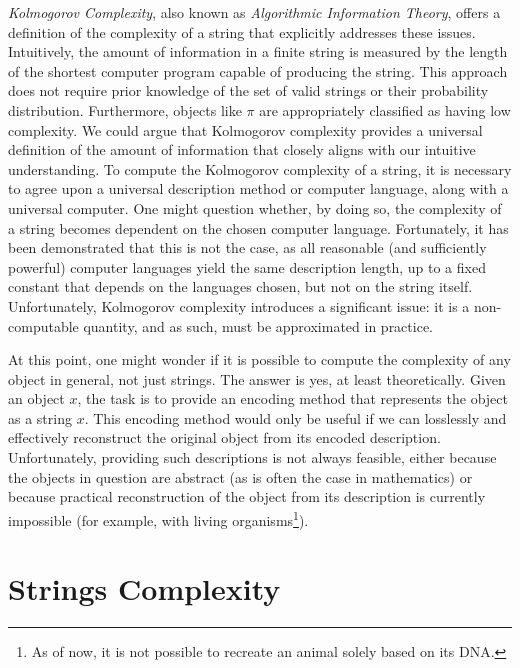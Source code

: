 \emph{Kolmogorov Complexity}, also known as \emph{Algorithmic Information Theory}, offers a definition of the complexity of a string that explicitly addresses these issues. Intuitively, the amount of information in a finite string is measured by the length of the shortest computer program capable of producing the string. This approach does not require prior knowledge of the set of valid strings or their probability distribution. Furthermore, objects like $\pi$ are appropriately classified as having low complexity. We could argue that Kolmogorov complexity provides a universal definition of the amount of information that closely aligns with our intuitive understanding. To compute the Kolmogorov complexity of a string, it is necessary to agree upon a universal description method or computer language, along with a universal computer. One might question whether, by doing so, the complexity of a string becomes dependent on the chosen computer language. Fortunately, it has been demonstrated that this is not the case, as all reasonable (and sufficiently powerful) computer languages yield the same description length, up to a fixed constant that depends on the languages chosen, but not on the string itself. Unfortunately, Kolmogorov complexity introduces a significant issue: it is a non-computable quantity, and as such, must be approximated in practice.

At this point, one might wonder if it is possible to compute the complexity of any object in general, not just strings. The answer is yes, at least theoretically. Given an object $x$, the task is to provide an encoding method that represents the object as a string  $x$. This encoding method would only be useful if we can losslessly and effectively reconstruct the original object from its encoded description. Unfortunately, providing such descriptions is not always feasible, either because the objects in question are abstract (as is often the case in mathematics) or because practical reconstruction of the object from its description is currently impossible (for example, with living organisms\footnote{As of now, it is not possible to recreate an animal solely based on its DNA.}).

%
%

\section{Strings Complexity}
\label{sec:strings_complexity}

